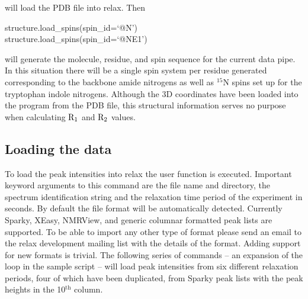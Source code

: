 
will load the PDB file  into relax.  Then 

\begin{exampleenv}
structure.load\_spins(spin\_id=`@N') \\
structure.load\_spins(spin\_id=`@NE1')
\end{exampleenv}

will generate the molecule, residue, and spin sequence for the current data pipe.  In this situation there will be a single spin system per residue generated corresponding to the backbone amide nitrogens as well as $^{15}$N spins set up for the tryptophan indole nitrogens.  Although the 3D coordinates have been loaded into the program from the PDB file, this structural information serves no purpose when calculating $\mathrm{R}_1$ and $\mathrm{R}_2$ values.



\subsection{Loading the data}

To load the peak intensities into relax the user function  is executed.  Important keyword arguments to this command are the file name and directory, the spectrum identification string and the relaxation time period of the experiment in seconds.  By default the file format will be automatically detected.  Currently Sparky, XEasy, NMRView, and generic columnar formatted peak lists are supported.  To be able to import any other type of format please send an email to the relax development mailing list with the details of the format.  Adding support for new formats is trivial.  The following series of commands -- an expansion of the  loop in the sample script -- will load peak intensities from six different relaxation periods, four of which have been duplicated, from Sparky peak lists with the peak heights in the 10$^\textrm{th}$ column.

